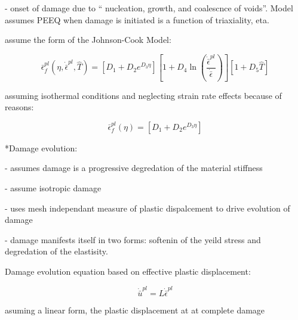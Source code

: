 - onset of damage due to `` nucleation, growth, and coalescnce of
voids''. Model assumes PEEQ when damage is initiated is a function
of triaxiality, eta.

assume the form of the Johnson-Cook Model:

\begin{equation}
\bar{\epsilon}_{f}^{pl}\left(\eta,\dot{\bar{\epsilon}}^{pl},\hat{T}\right)=\left[D_{1}+D_{2}e^{D_{3}\eta}\right]\left[1+D_{4}\ln\left(\frac{\dot{\bar{\epsilon}}^{pl}}{\dot{\bar{\epsilon}}}\right)\right]\left[1+D_{5}\hat{T}\right]\label{eqn:druc7}
\end{equation}


assuming isothermal conditions and neglecting strain rate effects
because of reasons:

\begin{equation}
\bar{\epsilon}_{f}^{pl}\left(\eta\right)=\left[D_{1}+D_{2}e^{D_{3}\eta}\right]\label{eqn:druc8}
\end{equation}


{*}Damage evolution:

- assumes damage is a progressive degredation of the material stiffness

- assume isotropic damage

- uses mesh independant measure of plastic dispalcement to drive evolution
of damage

- damage manifests itself in two forms: softenin of the yeild stress
and degredation of the elastisity.

Damage evolution equation based on effective plastic displacement:

\begin{equation}
\dot{\bar{u}}^{pl}=L\dot{\bar{\epsilon}}^{pl}\label{eqn:druc9}
\end{equation}


asuming a linear form, the plastic displacement at at complete damage
